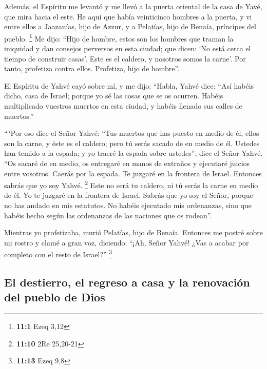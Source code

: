  Además, el Espíritu me levantó y me llevó a la puerta
oriental de la casa de Yavé, que mira hacia el este. He aquí que había
veinticinco hombres a la puerta, y vi entre ellos a Jaazanías, hijo de
Azzur, y a Pelatías, hijo de Benaía, príncipes del pueblo. \footnote{\textbf{11:1}
  Ezeq 3,12}  Me dijo: ``Hijo de hombre, estos son los
hombres que traman la iniquidad y dan consejos perversos en esta ciudad;
 que dicen: `No está cerca el tiempo de construir casas'.
Este es el caldero, y nosotros somos la carne'.  Por
tanto, profetiza contra ellos. Profetiza, hijo de hombre''.

 El Espíritu de Yahvé cayó sobre mí, y me dijo: ``Habla,
Yahvé dice: ``Así habéis dicho, casa de Israel; porque yo sé las cosas
que se os ocurren.  Habéis multiplicado vuestros muertos
en esta ciudad, y habéis llenado sus calles de muertos.''

 ``\,`Por eso dice el Señor Yahvé: ``Tus muertos que has
puesto en medio de él, ellos son la carne, y éste es el caldero; pero tú
serás sacado de en medio de él.  Ustedes han temido a la
espada; y yo traeré la espada sobre ustedes'', dice el Señor Yahvé.
 ``Os sacaré de en medio, os entregaré en manos de
extraños y ejecutaré juicios entre vosotros.  Caerás por
la espada. Te juzgaré en la frontera de Israel. Entonces sabrás que yo
soy Yahvé. \footnote{\textbf{11:10} 2Re 25,20-21}  Este
no será tu caldero, ni tú serás la carne en medio de él. Yo te juzgaré
en la frontera de Israel.  Sabrás que yo soy el Señor,
porque no has andado en mis estatutos. No habéis ejecutado mis
ordenanzas, sino que habéis hecho según las ordenanzas de las naciones
que os rodean''.

 Mientras yo profetizaba, murió Pelatías, hijo de Benaía.
Entonces me postré sobre mi rostro y clamé a gran voz, diciendo: ``¡Ah,
Señor Yahvé! ¿Vas a acabar por completo con el resto de Israel?''
\footnote{\textbf{11:13} Ezeq 9,8}

\hypertarget{el-destierro-el-regreso-a-casa-y-la-renovaciuxf3n-del-pueblo-de-dios}{%
\subsection{El destierro, el regreso a casa y la renovación del pueblo
de
Dios}\label{el-destierro-el-regreso-a-casa-y-la-renovaciuxf3n-del-pueblo-de-dios}}

